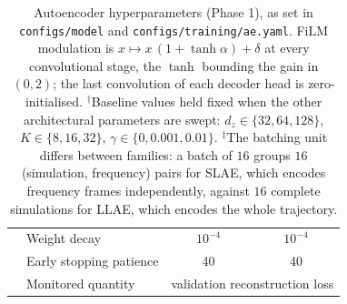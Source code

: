 ﻿\documentclass[a4paper,12pt]{article}
\theoremstyle{definition}
\theoremstyle{remark}
\begin{document}
\begin{table}[H]
\begin{tabular}{llcc}
          & Weight decay                    & $10^{-4}$ & $10^{-4}$ \\
          & Early stopping patience         & 40 & 40 \\
          & Monitored quantity              & \multicolumn{2}{c}{validation reconstruction loss} \\
        \bottomrule
    \end{tabular}
    \caption{Autoencoder hyperparameters (Phase 1), as set in \texttt{configs/model} and \texttt{configs/training/ae.yaml}. FiLM modulation is $x \mapsto x\,(1 + \tanh\alpha) + \delta$ at every convolutional stage, the $\tanh$ bounding the gain in $(0,2)$; the last convolution of each decoder head is zero-initialised. $^\dagger$Baseline values held fixed when the other architectural parameters are swept: $d_z \in \{32, 64, 128\}$, $K \in \{8, 16, 32\}$, $\gamma \in \{0, 0.001, 0.01\}$. $^\ddagger$The batching unit differs between families: a batch of $16$ groups $16$ (simulation, frequency) pairs for SLAE, which encodes frequency frames independently, against $16$ complete simulations for LLAE, which encodes the whole trajectory.}
    \label{tab:ae_hparams}
\end{table}
\end{document}
